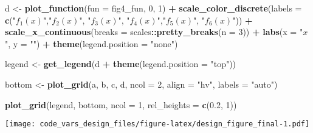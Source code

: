 \documentclass[11pt,]{article}
\newenvironment{Shaded}{\begin{snugshade}}{\end{snugshade}}
\newcommand{\DataTypeTok}[1]{\textcolor[rgb]{0.13,0.29,0.53}{#1}}
\newcommand{\DecValTok}[1]{\textcolor[rgb]{0.00,0.00,0.81}{#1}}
\newcommand{\FloatTok}[1]{\textcolor[rgb]{0.00,0.00,0.81}{#1}}
\newcommand{\KeywordTok}[1]{\textcolor[rgb]{0.13,0.29,0.53}{\textbf{#1}}}
\newcommand{\NormalTok}[1]{#1}
\newcommand{\OperatorTok}[1]{\textcolor[rgb]{0.81,0.36,0.00}{\textbf{#1}}}
\newcommand{\StringTok}[1]{\textcolor[rgb]{0.31,0.60,0.02}{#1}}
\begin{document}
\begin{Shaded}
\begin{Highlighting}[]
\NormalTok{d <-}\StringTok{ }\KeywordTok{plot_function}\NormalTok{(}\DataTypeTok{fun =}\NormalTok{ fig4_fun, }\DecValTok{0}\NormalTok{, }\DecValTok{1}\NormalTok{) }\OperatorTok{+}\StringTok{ }
\StringTok{  }\KeywordTok{scale_color_discrete}\NormalTok{(}\DataTypeTok{labels =} \KeywordTok{c}\NormalTok{(}\StringTok{"$f_1(x)$"}\NormalTok{,}\StringTok{"$f_2(x)$"}\NormalTok{, }\StringTok{"$f_3(x)$"}\NormalTok{, }
                                  \StringTok{"$f_4(x)$"}\NormalTok{,}\StringTok{"$f_5(x)$"}\NormalTok{, }\StringTok{"$f_6(x)$"}\NormalTok{)) }\OperatorTok{+}\StringTok{ }
\StringTok{  }\KeywordTok{scale_x_continuous}\NormalTok{(}\DataTypeTok{breaks =}\NormalTok{ scales}\OperatorTok{::}\KeywordTok{pretty_breaks}\NormalTok{(}\DataTypeTok{n =} \DecValTok{3}\NormalTok{)) }\OperatorTok{+}
\StringTok{  }\KeywordTok{labs}\NormalTok{(}\DataTypeTok{x =} \StringTok{"$x$"}\NormalTok{, }\DataTypeTok{y =} \StringTok{""}\NormalTok{) }\OperatorTok{+}
\StringTok{  }\KeywordTok{theme}\NormalTok{(}\DataTypeTok{legend.position =} \StringTok{"none"}\NormalTok{)}

\NormalTok{legend <-}\StringTok{ }\KeywordTok{get_legend}\NormalTok{(d }\OperatorTok{+}\StringTok{ }\KeywordTok{theme}\NormalTok{(}\DataTypeTok{legend.position =} \StringTok{"top"}\NormalTok{))}

\NormalTok{bottom <-}\StringTok{ }\KeywordTok{plot_grid}\NormalTok{(a, b, c, d, }\DataTypeTok{ncol =} \DecValTok{2}\NormalTok{, }\DataTypeTok{align =} \StringTok{"hv"}\NormalTok{, }\DataTypeTok{labels =} \StringTok{"auto"}\NormalTok{)}

\KeywordTok{plot_grid}\NormalTok{(legend, bottom, }\DataTypeTok{ncol =} \DecValTok{1}\NormalTok{, }\DataTypeTok{rel_heights =} \KeywordTok{c}\NormalTok{(}\FloatTok{0.2}\NormalTok{, }\DecValTok{1}\NormalTok{))}
\end{Highlighting}
\end{Shaded}

\texttt{[image: code\_vars\_design\_files/figure-latex/design\_figure\_final-1.pdf]}
\end{document}
